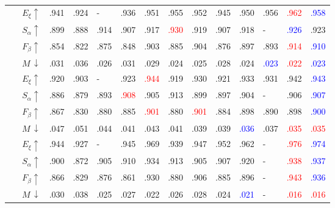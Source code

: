 \documentclass[runningheads]{llncs}
\begin{document}
\begin{table}[t]
\begin{center}
\begin{tabular}{p{0.7cm}<{\centering}|c|p{0.85cm}<{\centering}cp{0.75cm}<{\centering}p{0.75cm}<{\centering}cccccp{0.75cm}<{\centering}|cc}
				\multirow{4}{*}{\rotatebox{90}{NLPR}~\rotatebox{90}{~\cite{peng2014rgbd}}}    
				& $E_{\xi}\uparrow$ 
				& .941 & .924 & - & .936 & .951 & .955 & .952 & .945 & .950 & .956 & \textcolor{red}{.962} & \textcolor{blue}{.958} \\
				& $S_{\alpha}\uparrow$ 
				& .899 & .888 & .914 & .907 & .917 & \textcolor{red}{.930} & .919 & .907 & .918 & - & \textcolor{blue}{.926} & .923 \\
				& $F_{\beta}\uparrow$ 
				& .854 & .822 & .875 & .848 & .903 & .885 & .904 & .876 & .897 & .893 & \textcolor{red}{.914} & \textcolor{blue}{.910} \\
				& $M\,\downarrow$ 
				& .031 & .036 & .026 & .031 & .029 & .024 & .025 & .028 & .024 & \textcolor{blue}{.023} & \textcolor{red}{.022} & \textcolor{blue}{.023} \\ \hline
				
				\multirow{4}{*}{\rotatebox{90}{STERE}~\rotatebox{90}{~~\cite{niu2012leveraging}}}    
				& $E_{\xi}\uparrow$ 
				& .920 & .903 & - & .923 & \textcolor{red}{.944} & .919 & .930 & .921 & .933 & .931 & .942 & \textcolor{blue}{.943} \\
				& $S_{\alpha}\uparrow$ 
				& .886 & .879 & .893 & \textcolor{red}{.908} & .905 & .913 & .899 & .897 & .904 & - & .906 & \textcolor{blue}{.907} \\
				& $F_{\beta}\uparrow$ 
				& .867 & .830 & .880 & .885 & \textcolor{red}{.901} & .880 & \textcolor{red}{.901} & .884 & .898 & .890 & .898 & \textcolor{blue}{.900} \\
				& $M\,\downarrow$ 
				& .047 & .051 & .044 & .041 & .043 & .041 & .039 & .039 & \textcolor{blue}{.036} & .037 & \textcolor{red}{.035} & \textcolor{red}{.035} \\ \hline
				
				\multirow{4}{*}{\rotatebox{90}{DES}~\rotatebox{90}{~\cite{cheng2014depth}}}    
				& $E_{\xi}\uparrow$ 
				& .944 & .927 & - & .945 & .969 & .939 & .947 & .952 & .962 & - & \textcolor{red}{.976} & \textcolor{blue}{.974} \\
				& $S_{\alpha}\uparrow$ 
				& .900 & .872 & .905 & .910 & .934 & .913 & .905 & .907 & .920 & - & \textcolor{red}{.938} & \textcolor{blue}{.937} \\
				& $F_{\beta}\uparrow$ 
				& .866 & .829 & .876 & .861 & .930 & .880 & .906 & .885 & .896 & - & \textcolor{red}{.943} & \textcolor{blue}{.936} \\
				& $M\,\downarrow$ 
				& .030 & .038 & .025 & .027 & .022 & .026 & .028 & .024 & \textcolor{blue}{.021} & - & \textcolor{red}{.016} & \textcolor{red}{.016} \\ \hline
				

\end{tabular}
\end{center}
\end{table}
\end{document}
